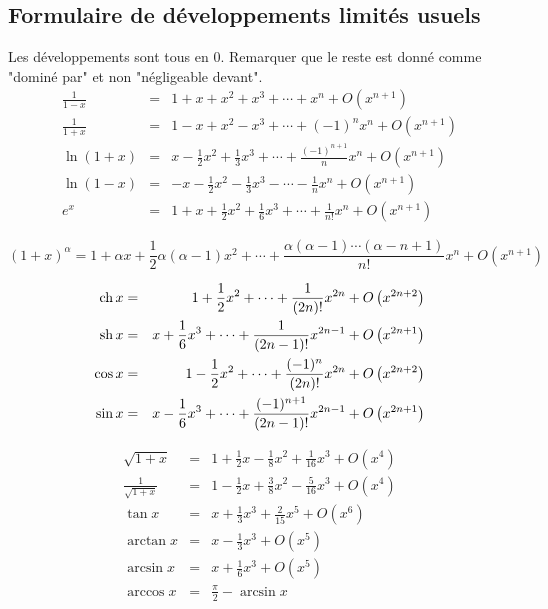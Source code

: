 \clearpage
\subsection{Formulaire de développements limités usuels}
Les développements sont tous en $0$. Remarquer que le reste est donné comme "dominé par" et non "négligeable devant".
\begin{eqnarray*}
\frac 1{1-x} &=&1+x+x^2+x^3+\cdots +x^n+O\left( x^{n+1}\right) \\
\frac 1{1+x} &=&1-x+x^2-x^3+\cdots +(-1)^nx^n+O\left( x^{n+1}\right) \\
\ln (1+x) &=&x-\frac 12x^2+\frac 13x^3+\cdots +\frac{(-1)^{n+1}}nx^n+O\left(
x^{n+1}\right) \\
\ln (1-x) &=&-x-\frac 12x^2-\frac 13x^3-\cdots -\frac 1nx^n+O\left(
x^{n+1}\right) \\
e^x &=&1+x+\frac 12x^2+\frac 16x^3+\cdots +\frac 1{n!}x^n+O\left(
x^{n+1}\right)
\end{eqnarray*}

\[
(1+x)^\alpha =1+\alpha x+\frac 12\alpha \left( \alpha -1\right) x^2+\cdots +%
\frac{\alpha (\alpha -1)\cdots (\alpha -n+1)}{n!}x^n+O\left( x^{n+1}\right) 
\]

\begin{eqnarray*}
\ch x &=&1+\frac{1}{2}x^{2}+\cdots +\frac{1}{(2n)!}x^{2n}+O\left(
x^{2n+2}\right)  \\
\sh x &=&x+\frac{1}{6}x^{3}+\cdots +\frac{1}{(2n-1)!}x^{2n-1}+O\left(
x^{2n+1}\right)  \\
\cos x &=&1-\frac{1}{2}x^{2}+\cdots +\frac{(-1)^{n}}{(2n)!}x^{2n}+O\left(
x^{2n+2}\right)  \\
\sin x &=&x-\frac{1}{6}x^{3}+\cdots +\frac{(-1)^{n+1}}{(2n-1)!}%
x^{2n-1}+O\left( x^{2n+1}\right) 
\end{eqnarray*}

\begin{eqnarray*}
\sqrt{1+x} &=&1+\frac{1}{2}x-\frac{1}{8}x^{2}+\frac{1}{16}x^{3}+O\left(
x^{4}\right)  \\
\frac{1}{\sqrt{1+x}} &=&1-\frac{1}{2}x+\frac{3}{8}x^{2}-\frac{5}{16}%
x^{3}+O\left( x^{4}\right)  \\
\tan x &=&x+\frac{1}{3}x^{3}+\frac{2}{15}x^{5}+O\left( x^{6}\right)  \\
\arctan x &=&x-\frac{1}{3}x^{3}+O\left( x^{5}\right)  \\
\arcsin x &=&x+\frac{1}{6}x^{3}+O\left( x^{5}\right)  \\
\arccos x &=&\frac{\pi }{2}-\arcsin x
\end{eqnarray*}



